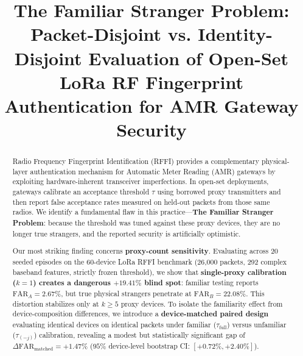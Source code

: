 \documentclass[conference]{IEEEtran}
\begin{document}
\title{The Familiar Stranger Problem: Packet-Disjoint vs. Identity-Disjoint Evaluation of Open-Set LoRa RF Fingerprint Authentication for AMR Gateway Security}

\author{
}

\maketitle

\begin{abstract}
Radio Frequency Fingerprint Identification (RFFI) provides a complementary physical-layer authentication mechanism for Automatic Meter Reading (AMR) gateways by exploiting hardware-inherent transceiver imperfections. In open-set deployments, gateways calibrate an acceptance threshold $\tau$ using borrowed proxy transmitters and then report false acceptance rates measured on held-out packets from those same radios. We identify a fundamental flaw in this practice---\textbf{The Familiar Stranger Problem}: because the threshold was tuned against these proxy devices, they are no longer true strangers, and the reported security is artificially optimistic.

Our most striking finding concerns \textbf{proxy-count sensitivity}. Evaluating across 20 seeded episodes on the 60-device LoRa RFFI benchmark (26,000 packets, 292 complex baseband features, strictly frozen threshold), we show that \textbf{single-proxy calibration ($k=1$) creates a dangerous $+19.41\%$ blind spot}: familiar testing reports $\text{FAR}_A = 2.67\%$, but true physical strangers penetrate at $\text{FAR}_B = 22.08\%$. This distortion stabilizes only at $k \ge 5$ proxy devices. To isolate the familiarity effect from device-composition differences, we introduce a \textbf{device-matched paired design} evaluating identical devices on identical packets under familiar ($\tau_{\text{full}}$) versus unfamiliar ($\tau_{(-j)}$) calibration, revealing a modest but statistically significant gap of $\Delta\text{FAR}_{\text{matched}} = +1.47\%$ ($95\%$ device-level bootstrap CI: $[+0.72\%, +2.40\%]$).


\end{abstract}
\end{document}
